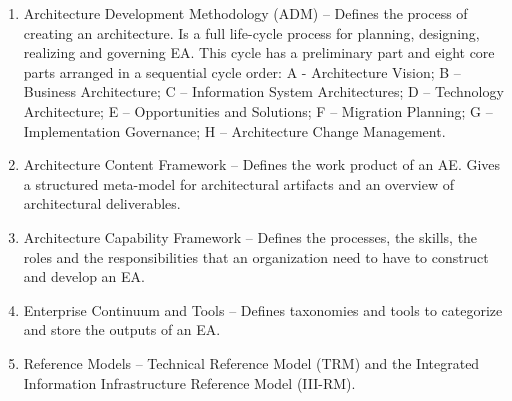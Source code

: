 \documentclass[runningheads]{llncs}
\begin{document}
\begin{enumerate}
\item Architecture Development Methodology (ADM) – Defines the process of creating an architecture. Is a full life-cycle process for planning, designing, realizing and governing EA. This cycle has a preliminary part and eight core parts arranged in a sequential cycle order: A - Architecture Vision;  B – Business Architecture; C – Information System Architectures; D – Technology Architecture; E – Opportunities and Solutions; F – Migration Planning; G – Implementation Governance; H – Architecture Change Management. 
\item Architecture Content Framework – Defines the work product of an AE. Gives a structured meta-model for architectural artifacts and an overview of architectural deliverables. 
\item Architecture Capability Framework – Defines the processes, the skills, the roles and the responsibilities that an organization need to have to construct and develop an EA.
\item Enterprise Continuum and Tools – Defines taxonomies and tools to categorize and store the outputs of an EA.
\item Reference Models – Technical Reference Model (TRM) and the Integrated Information Infrastructure Reference Model (III-RM).

\end{enumerate}
\end{document}
